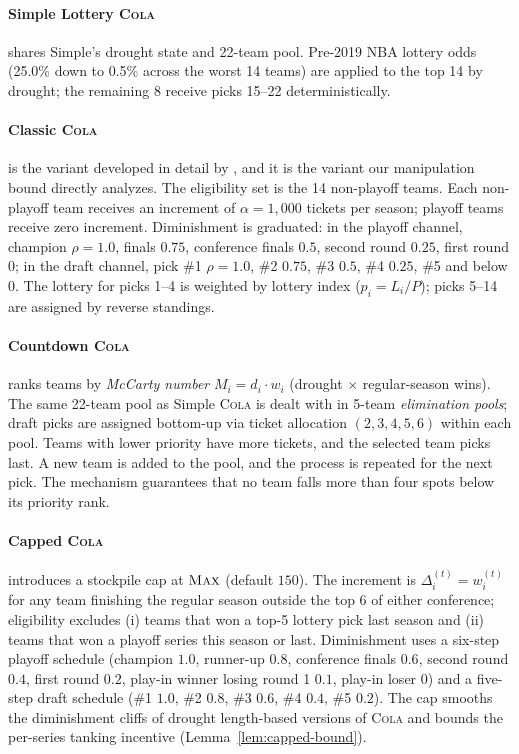 \documentclass{article}
\newcommand{\cola}{\textup{\textsc{Cola}}}
\newcommand{\Max}{\textup{\textsc{Max}}}
\begin{document}
\paragraph{Simple Lottery \cola{}} shares Simple's drought state and 22-team pool. Pre-2019 NBA lottery odds (25.0\% down to 0.5\% across the worst 14 teams) are applied to the top 14 by drought; the remaining 8 receive picks 15--22 deterministically.

\paragraph{Classic \cola{}} is the variant developed in detail by \citet{highley2026cola}, and it is the variant our manipulation bound directly analyzes. The eligibility set is the 14 non-playoff teams. Each non-playoff team receives an increment of $\alpha = 1{,}000$ tickets per season; playoff teams receive zero increment. Diminishment is graduated: in the playoff channel, champion $\rho = 1.0$, finals $0.75$, conference finals $0.5$, second round $0.25$, first round $0$; in the draft channel, pick \#1 $\rho = 1.0$, \#2 $0.75$, \#3 $0.5$, \#4 $0.25$, \#5 and below $0$. The lottery for picks 1--4 is weighted by lottery index ($p_i = L_i / P$); picks 5--14 are assigned by reverse standings.

\paragraph{Countdown \cola{}} ranks teams by \emph{McCarty number} $M_i = d_i \cdot w_i$ (drought $\times$ regular-season wins). The same 22-team pool as Simple \cola{} is dealt with in 5-team \emph{elimination pools}; draft picks are assigned bottom-up via ticket allocation $(2, 3, 4, 5, 6)$ within each pool. Teams with lower priority have more tickets, and the selected team picks last. A new team is added to the pool, and the process is repeated for the next pick. The mechanism guarantees that no team falls more than four spots below its priority rank.

\paragraph{Capped \cola{}} \citep{highley2026solvable5} introduces a stockpile cap at $\Max$ (default $150$). The increment is $\Delta_i^{(t)} = w_i^{(t)}$ for any team finishing the regular season outside the top 6 of either conference; eligibility excludes (i) teams that won a top-5 lottery pick last season and (ii) teams that won a playoff series this season or last. Diminishment uses a six-step playoff schedule (champion $1.0$, runner-up $0.8$, conference finals $0.6$, second round $0.4$, first round $0.2$, play-in winner losing round 1 $0.1$, play-in loser $0$) and a five-step draft schedule (\#1 $1.0$, \#2 $0.8$, \#3 $0.6$, \#4 $0.4$, \#5 $0.2$). The cap smooths the diminishment cliffs of drought length-based versions of \cola{} and bounds the per-series tanking incentive (Lemma~\ref{lem:capped-bound}).
\end{document}
